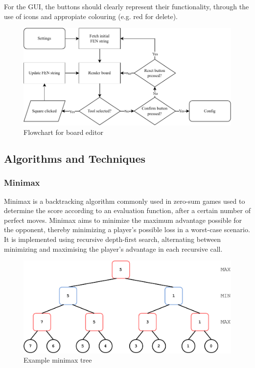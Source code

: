\documentclass[../main/main.tex]{subfiles}
\begin{document}
For the GUI, the buttons should clearly represent their functionality, through the use of icons and appropiate colouring (e.g. red for delete).

\begin{figure}[H]
    \centering
    \includegraphics[width=\columnwidth]{../design/assets/editor_flowchart.pdf}
    \caption{Flowchart for board editor}
    \label{fig:editor-flowchart}
\end{figure}

\subsection{Algorithms and Techniques}
\subsubsection{Minimax}
Minimax is a backtracking algorithm commonly used in zero-sum games used to determine the score according to an evaluation function, after a certain number of perfect moves. Minimax aims to minimize the maximum advantage possible for the opponent, thereby minimizing a player’s possible loss in a worst-case scenario. It is implemented using recursive depth-first search, alternating between minimizing and maximising the player’s advantage in each recursive call.

\begin{figure}[H]
    \centering
    \includegraphics[width=\columnwidth]{../design/assets/minimax.pdf}
    \caption{Example minimax tree}
    \label{fig:minimax}
\end{figure}
\end{document}
